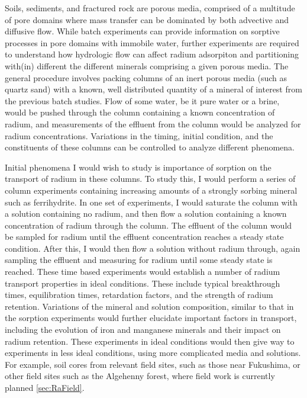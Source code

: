 \documentclass[twoside,12pt,titlepage]{article}
\begin{document}
Soils, sediments, and fractured rock are porous media, comprised of a multitude of pore domains where mass transfer can be dominated by both advective and diffusive flow. While batch experiments can provide information on sorptive processes in pore domains with immobile water, further experiments are required to understand how hydrologic flow can affect radium adsorpiton and partitioning with(in) different the different minerals comprising a given porous media. The general procedure involves packing columns of an inert porous media (such as quartz sand) with a known, well distributed quantity of a mineral of interest from the previous batch studies. Flow of some water, be it pure water or a brine, would be pushed through the column containing a known concentration of radium, and measurements of the effluent from the column would be analyzed for radium concentrations. Variations in the timing, initial condition, and the constituents of these columns can be controlled to analyze different phenomena.
\par Initial phenomena I would wish to study is importance of sorption on the transport of radium in these columns. To study this, I would perform a series of column experiments containing increasing amounts of a strongly sorbing mineral such as ferrihydrite. In one set of experiments, I would saturate the column with a solution containing no radium, and then flow a solution containing a known concentration of radium through the column. The effluent of the column would be sampled for radium until the effluent concentration reaches a steady state condition. After this, I would then flow a solution without radium through, again sampling the effluent and measuring for radium until some steady state is reached. These time based experiments would establish a number of radium transport properties in ideal conditions. These include typical breakthrough times, equilibration times, retardation factors, and the strength of radium retention. Variations of the mineral and solution composition, similar to that in the sorption experiments would further elucidate important factors in transport, including the evolution of iron and manganese minerals and their impact on radium retention. These experiments in ideal conditions would then give way to experiments in less ideal conditions, using more complicated media and solutions. For example, soil cores from relevant field sites, such as those near Fukushima, or other field sites such as the Algehenny forest, where field work is currently planned \ref{sec:RaField}.
\end{document}

